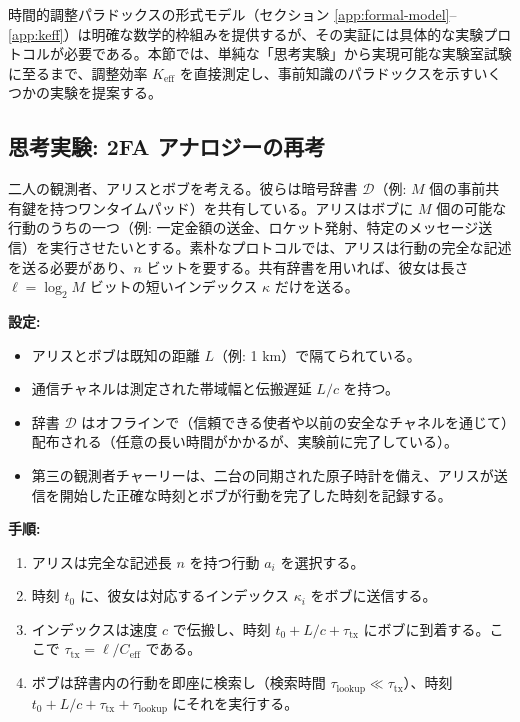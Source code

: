 \documentclass[12pt,a4paper]{ltjsarticle}
\begin{document}
	時間的調整パラドックスの形式モデル（セクション \ref{app:formal-model}--\ref{app:keff}）は明確な数学的枠組みを提供するが、その実証には具体的な実験プロトコルが必要である。本節では、単純な「思考実験」から実現可能な実験室試験に至るまで、調整効率 \(K_{\mathrm{eff}}\) を直接測定し、事前知識のパラドックスを示すいくつかの実験を提案する。
	
	\subsection{思考実験: 2FA アナロジーの再考}
	\label{subsec:thought-2fa}
	
	二人の観測者、アリスとボブを考える。彼らは暗号辞書 \(\mathcal{D}\)（例: \(M\) 個の事前共有鍵を持つワンタイムパッド）を共有している。アリスはボブに \(M\) 個の可能な行動のうちの一つ（例: 一定金額の送金、ロケット発射、特定のメッセージ送信）を実行させたいとする。素朴なプロトコルでは、アリスは行動の完全な記述を送る必要があり、\(n\) ビットを要する。共有辞書を用いれば、彼女は長さ \(\ell = \log_2 M\) ビットの短いインデックス \(\kappa\) だけを送る。
	
	\textbf{設定:}
	\begin{itemize}
		\item アリスとボブは既知の距離 \(L\)（例: 1 km）で隔てられている。
		\item 通信チャネルは測定された帯域幅と伝搬遅延 \(L/c\) を持つ。
		\item 辞書 \(\mathcal{D}\) はオフラインで（信頼できる使者や以前の安全なチャネルを通じて）配布される（任意の長い時間がかかるが、実験前に完了している）。
		\item 第三の観測者チャーリーは、二台の同期された原子時計を備え、アリスが送信を開始した正確な時刻とボブが行動を完了した時刻を記録する。
	\end{itemize}
	
	\textbf{手順:}
	\begin{enumerate}
		\item アリスは完全な記述長 \(n\) を持つ行動 \(a_i\) を選択する。
		\item 時刻 \(t_0\) に、彼女は対応するインデックス \(\kappa_i\) をボブに送信する。
		\item インデックスは速度 \(c\) で伝搬し、時刻 \(t_0 + L/c + \tau_{\text{tx}}\) にボブに到着する。ここで \(\tau_{\text{tx}} = \ell / C_{\text{eff}}\) である。
		\item ボブは辞書内の行動を即座に検索し（検索時間 \(\tau_{\text{lookup}} \ll \tau_{\text{tx}}\)）、時刻 \(t_0 + L/c + \tau_{\text{tx}} + \tau_{\text{lookup}}\) にそれを実行する。
	\end{enumerate}
	
\end{document}
